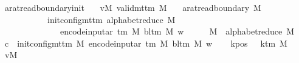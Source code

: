 \begin{isabellebody}
\endisatagproof
{\isafoldproof}%
%
\isadelimproof
\isanewline
%
\endisadelimproof
\isanewline
{}\isamarkupfalse%
\ ar{\isacharunderscore}{\kern0pt}at{\isacharunderscore}{\kern0pt}read{\isacharunderscore}{\kern0pt}boundary{\isacharunderscore}{\kern0pt}init{\isacharcolon}{\kern0pt}\isanewline
\ \ \ vM{\isacharcolon}{\kern0pt}\ {\isachardoublequoteopen}valid{\isacharunderscore}{\kern0pt}mttm\ M{\isachardoublequoteclose}\isanewline
\ \ \ {\isachardoublequoteopen}ar{\isacharunderscore}{\kern0pt}at{\isacharunderscore}{\kern0pt}read{\isacharunderscore}{\kern0pt}boundary\ M\isanewline
\ \ \ \ \ \ \ \ \ \ \ {\isacharparenleft}{\kern0pt}init{\isacharunderscore}{\kern0pt}config{\isacharunderscore}{\kern0pt}mttm\ {\isacharparenleft}{\kern0pt}alphabet{\isacharunderscore}{\kern0pt}reduce\ M{\isacharparenright}{\kern0pt}\isanewline
\ \ \ \ \ \ \ \ \ \ \ \ \ \ {\isacharparenleft}{\kern0pt}encode{\isacharunderscore}{\kern0pt}input{\isacharunderscore}{\kern0pt}ar\ {\isacharparenleft}{\kern0pt}{\isasymGamma}{\isacharunderscore}{\kern0pt}tm\ M{\isacharparenright}{\kern0pt}\ {\isacharparenleft}{\kern0pt}bl{\isacharunderscore}{\kern0pt}tm\ M{\isacharparenright}{\kern0pt}\ w{\isacharparenright}{\kern0pt}{\isacharparenright}{\kern0pt}{\isachardoublequoteclose}\isanewline
%
\isadelimproof
%
\endisadelimproof
%
\isatagproof
{}\isamarkupfalse%
\ {\isacharminus}{\kern0pt}\isanewline
\ \ \isamarkupfalse%
\ {\isacharquery}{\kern0pt}M{\isacharprime}{\kern0pt}\ {\isacharequal}{\kern0pt}\ {\isachardoublequoteopen}alphabet{\isacharunderscore}{\kern0pt}reduce\ M{\isachardoublequoteclose}\isanewline
\ \ \isamarkupfalse%
\ {\isacharquery}{\kern0pt}c{\isacharprime}{\kern0pt}\ {\isacharequal}{\kern0pt}\ {\isachardoublequoteopen}init{\isacharunderscore}{\kern0pt}config{\isacharunderscore}{\kern0pt}mttm\ {\isacharquery}{\kern0pt}M{\isacharprime}{\kern0pt}\ {\isacharparenleft}{\kern0pt}encode{\isacharunderscore}{\kern0pt}input{\isacharunderscore}{\kern0pt}ar\ {\isacharparenleft}{\kern0pt}{\isasymGamma}{\isacharunderscore}{\kern0pt}tm\ M{\isacharparenright}{\kern0pt}\ {\isacharparenleft}{\kern0pt}bl{\isacharunderscore}{\kern0pt}tm\ M{\isacharparenright}{\kern0pt}\ w{\isacharparenright}{\kern0pt}{\isachardoublequoteclose}\isanewline
\ \ \isamarkupfalse%
\ kpos{\isacharcolon}{\kern0pt}\ {\isachardoublequoteopen}{}\ {\isacharless}{\kern0pt}\ k{\isacharunderscore}{\kern0pt}tm\ M{\isachardoublequoteclose}\ \isamarkupfalse%
\ vM\ \isamarkupfalse%

\end{isabellebody}
